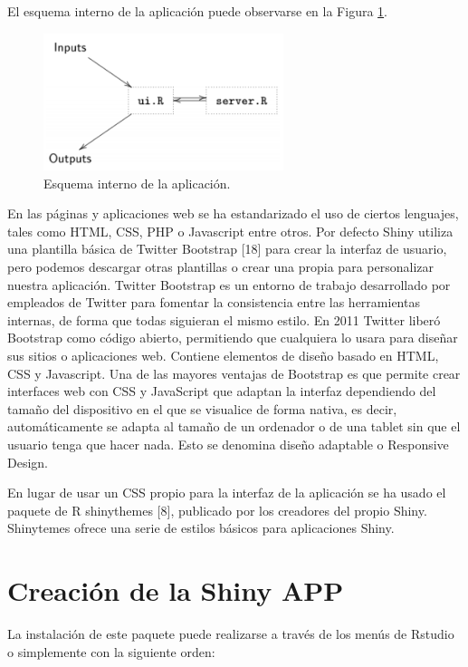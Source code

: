 El esquema interno de la aplicación puede observarse en la Figura \ref{fig:fig31}. 

\begin{figure}[h]
\begin{center}
\includegraphics[width=7cm]{./Graficos/figura7}
\end{center}
\caption{Esquema interno de la aplicación.}
\label{fig:fig31}
\end{figure}


En las páginas y aplicaciones web se ha estandarizado el uso de ciertos lenguajes, tales como HTML, CSS, PHP o Javascript entre otros. Por defecto Shiny utiliza una plantilla básica de Twitter Bootstrap [18] para crear la interfaz de usuario, pero podemos descargar otras plantillas o crear una propia para personalizar nuestra aplicación. Twitter Bootstrap es un entorno de trabajo desarrollado por empleados de Twitter para fomentar la consistencia entre las herramientas internas, de forma que todas siguieran el mismo estilo. En 2011 Twitter liberó Bootstrap como código abierto, permitiendo que cualquiera lo usara para diseñar sus sitios o aplicaciones web. Contiene elementos de diseño basado en HTML, CSS y Javascript. Una de las mayores ventajas de Bootstrap es que permite crear interfaces web con CSS y JavaScript que adaptan la interfaz dependiendo del tamaño del dispositivo en el que se visualice de forma nativa, es decir, automáticamente se adapta al tamaño de un ordenador o de una tablet sin que el usuario tenga que hacer nada. Esto se denomina diseño adaptable o Responsive Design.

En lugar de usar un CSS propio para la interfaz de la aplicación se ha usado el paquete de R shinythemes [8], publicado por los creadores del propio Shiny. Shinytemes ofrece una serie de estilos básicos para aplicaciones Shiny.



\section{Creación de la Shiny APP}
La instalación de este paquete puede realizarse a través de los menús de Rstudio o simplemente con la siguiente orden:\\


